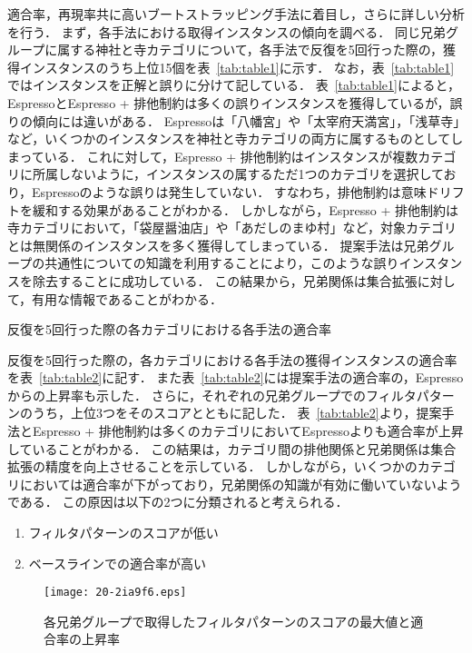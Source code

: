 \documentclass[japanese]{jnlp_1.4}
\begin{document}
適合率，再現率共に高いブートストラッピング手法に着目し，さらに詳しい分析を行う．
まず，各手法における取得インスタンスの傾向を調べる．
同じ兄弟グループに属する神社と寺カテゴリについて，各手法で反復を5回行った際の，獲得インスタンスのうち上位15個を表~\ref{tab:table1}に示す．
なお，表~\ref{tab:table1}ではインスタンスを正解と誤りに分けて記している．
表~\ref{tab:table1}によると，EspressoとEspresso + 排他制約は多くの誤りインスタンスを獲得しているが，誤りの傾向には違いがある．
Espressoは「八幡宮」や「太宰府天満宮」，「浅草寺」など，いくつかのインスタンスを神社と寺カテゴリの両方に属するものとしてしまっている．
これに対して，Espresso + 排他制約はインスタンスが複数カテゴリに所属しないように，インスタンスの属するただ1つのカテゴリを選択しており，Espressoのような誤りは発生していない．
すなわち，排他制約は意味ドリフトを緩和する効果があることがわかる．
しかしながら，Espresso + 排他制約は寺カテゴリにおいて，「袋屋醤油店」や「あだしのまゆ村」など，対象カテゴリとは無関係のインスタンスを多く獲得してしまっている．
提案手法は兄弟グループの共通性についての知識を利用することにより，このような誤りインスタンスを除去することに成功している．
この結果から，兄弟関係は集合拡張に対して，有用な情報であることがわかる．


\newcommand{\ThreeLine}[3]{}
\begin{table}[p]
  \caption{反復を5回行った際の各カテゴリにおける各手法の適合率}
 \label{tab:table2}

\end{table}

反復を5回行った際の，各カテゴリにおける各手法の獲得インスタンスの適合率を表~\ref{tab:table2}に記す．
また表~\ref{tab:table2}には提案手法の適合率の，Espressoからの上昇率も示した．
さらに，それぞれの兄弟グループでのフィルタパターンのうち，上位3つをそのスコアとともに記した．
表~\ref{tab:table2}より，提案手法とEspresso + 排他制約は多くのカテゴリにおいてEspressoよりも適合率が上昇していることがわかる．
この結果は，カテゴリ間の排他関係と兄弟関係は集合拡張の精度を向上させることを示している．
しかしながら，いくつかのカテゴリにおいては適合率が下がっており，兄弟関係の知識が有効に働いていないようである．
この原因は以下の2つに分類されると考えられる．

\begin{enumerate}
\item フィルタパターンのスコアが低い\label{case1}
\item ベースラインでの適合率が高い\label{case2}
\end{enumerate}

\begin{figure}[b]
\begin{center}
\texttt{[image: 20-2ia9f6.eps]}
\end{center}
 \caption{各兄弟グループで取得したフィルタパターンのスコアの最大値と適合率の上昇率}
 \label{fig:figure5}
\end{figure}
\end{document}
